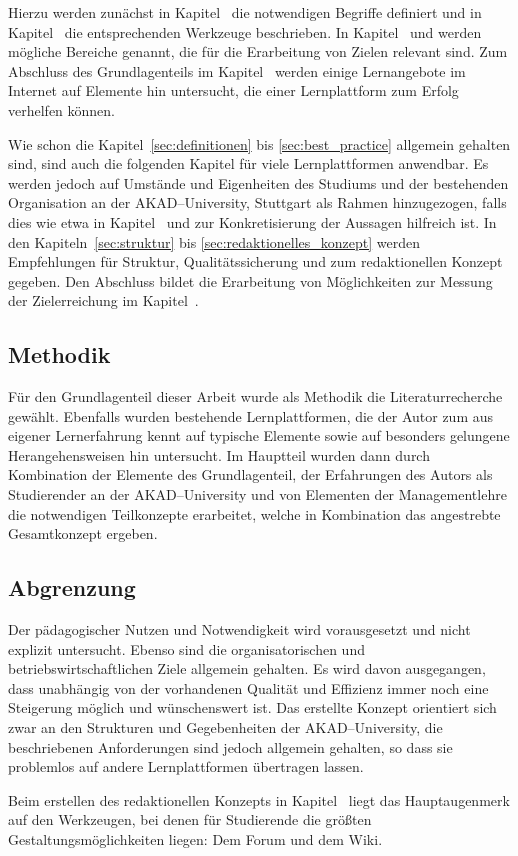 Hierzu werden zunächst in Kapitel~ die notwendigen Begriffe definiert und in Kapitel~ die entsprechenden Werkzeuge beschrieben. In Kapitel~ und  werden mögliche Bereiche genannt, die für die Erarbeitung von Zielen relevant sind. Zum Abschluss des Grundlagenteils im Kapitel~ werden einige Lernangebote im Internet auf Elemente hin untersucht, die einer Lernplattform zum Erfolg verhelfen können.

Wie schon die Kapitel~\ref{sec:definitionen} bis \ref{sec:best_practice} allgemein gehalten sind, sind auch die folgenden Kapitel für viele Lernplattformen anwendbar. Es werden jedoch auf Umstände und Eigenheiten des Studiums und der bestehenden Organisation an der AKAD–University, Stuttgart als Rahmen hinzugezogen, falls dies wie etwa in Kapitel~ und  zur Konkretisierung der Aussagen hilfreich ist. In den Kapiteln~\ref{sec:struktur} bis \ref{sec:redaktionelles_konzept} werden Empfehlungen für Struktur, Qualitätssicherung und zum redaktionellen Konzept gegeben. Den Abschluss bildet die Erarbeitung von Möglichkeiten zur Messung der Zielerreichung im Kapitel~.

\subsection{Methodik} %
\label{sub:methodik}
Für den Grundlagenteil dieser Arbeit wurde als Methodik die Literaturrecherche gewählt. Ebenfalls wurden bestehende Lernplattformen, die der Autor zum aus eigener Lernerfahrung kennt auf typische Elemente sowie auf besonders gelungene Herangehensweisen hin untersucht. Im Hauptteil wurden dann durch Kombination der Elemente des Grundlagenteil, der Erfahrungen des Autors als Studierender an der AKAD–University und von Elementen der Managementlehre die notwendigen Teilkonzepte erarbeitet, welche in Kombination das angestrebte Gesamtkonzept ergeben.

\subsection{Abgrenzung} %
\label{sub:abgrenzung}
Der pädagogischer Nutzen und Notwendigkeit wird vorausgesetzt und nicht explizit untersucht. Ebenso sind die organisatorischen und betriebswirtschaftlichen Ziele allgemein gehalten. Es wird davon ausgegangen, dass unabhängig von der vorhandenen Qualität und Effizienz immer noch eine Steigerung möglich und wünschenswert ist. Das erstellte Konzept orientiert sich zwar an den Strukturen und Gegebenheiten der AKAD–University, die beschriebenen Anforderungen sind jedoch allgemein gehalten, so dass sie problemlos auf andere Lernplattformen übertragen lassen. 

Beim erstellen des redaktionellen Konzepts in Kapitel~ liegt das Hauptaugenmerk auf den Werkzeugen, bei denen für Studierende die größten Gestaltungsmöglichkeiten liegen: Dem Forum und dem Wiki. 

